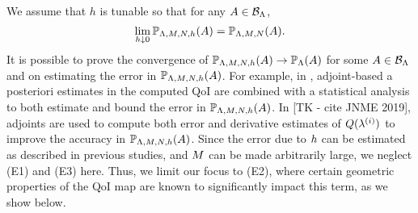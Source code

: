 We assume that $h$ is tunable so that for any $A\in \mathcal{B}_{{\Lambda}}$,
\[
\lim\limits_{h \downarrow 0} \mathbb{P}_{{\Lambda}, M, N, h} (A) = \mathbb{P}_{{\Lambda}, M, N} (A).
\]
It is possible to prove the convergence of $\mathbb{P}_{{\Lambda}, M, N, h} (A) \to \mathbb{P}_{\Lambda} (A)$ for some $A\in \mathcal{B}_{{\Lambda}}$ and on estimating the error in $\mathbb{P}_{{\Lambda}, M, N, h}(A)$.
For example, in \cite{BGE+15}, adjoint-based a posteriori estimates in the computed QoI are combined with a statistical analysis to both estimate and bound the error in $\mathbb{P}_{{\Lambda}, M, N, h} (A)$.
In [TK - cite JNME 2019], adjoints are used to compute both error and derivative estimates of $Q(\lambda^{(i)})$ to improve the accuracy in $\mathbb{P}_{{\Lambda}, M, N, h} (A)$.
Since the error due to $h$ can be estimated as described in previous studies, and $M$ can be made arbitrarily large, we neglect (E1) and (E3) here.
Thus, we limit our focus to (E2), where certain geometric properties of the QoI map are known to significantly impact this term, as we show below.


